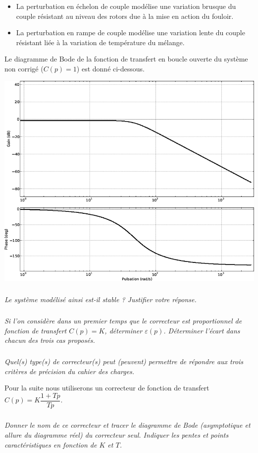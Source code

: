 \documentclass[10pt,fleqn]{article} %
\begin{document}
\begin{multicols}{2}
\begin{rem}
\begin{itemize}
\item La perturbation en échelon de couple modélise une variation brusque du couple résistant au niveau des rotors due à la mise en action du fouloir.
\item La perturbation en rampe de couple modélise une variation lente du couple résistant liée à la variation de température du mélange.
\end{itemize}
\end{rem}

Le diagramme de Bode de la fonction de transfert en boucle ouverte du système non corrigé ($C(p) = 1$) est donné ci-dessous.

\begin{center}
\includegraphics[width=.8\linewidth]{images/e3a_08.png}
\end{center}


\subparagraph{}
\textit{Le système modélisé ainsi est-il stable ? Justifier votre réponse.}

\subparagraph{}
\textit{Si l'on considère dans un premier temps que le correcteur est proportionnel de fonction de transfert $C(p) = K$, déterminer $\varepsilon(p)$. Déterminer l'écart dans chacun des trois cas proposés.}

\subparagraph{}
\textit{Quel(s) type(s) de correcteur(s) peut (peuvent) permettre de répondre aux trois critères de précision du cahier des charges.}

Pour la suite nous utiliserons un correcteur de fonction de transfert  $C(p)=K\dfrac{1+Tp}{Tp}$.

\subparagraph{}
\textit{Donner le nom de ce correcteur et tracer le diagramme de Bode (asymptotique et allure du diagramme réel) du correcteur seul. Indiquer les pentes et points caractéristiques en fonction de $K$ et $T$.}


\end{multicols}
\end{document}
